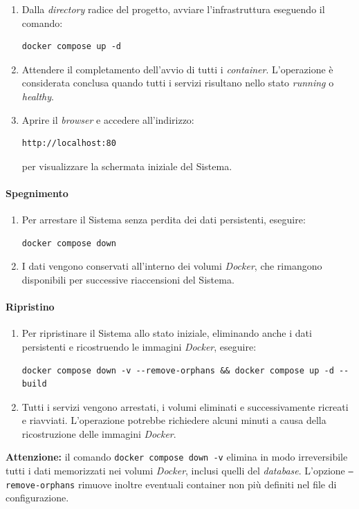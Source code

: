 \documentclass[10pt, letterpaper]{article}
\begin{document}
\begin{enumerate}
    \item Dalla \textit{directory} radice del progetto, avviare l'infrastruttura eseguendo il comando:
\begin{verbatim}
docker compose up -d
\end{verbatim}

    \item Attendere il completamento dell'avvio di tutti i \textit{container}. L'operazione è considerata conclusa quando tutti i servizi risultano nello stato \textit{running} o \textit{healthy}.

    \item Aprire il \textit{browser} e accedere all'indirizzo:
\begin{verbatim}
http://localhost:80
\end{verbatim}
per visualizzare la schermata iniziale del Sistema.
\end{enumerate}

\paragraph{Spegnimento}

\begin{enumerate}
    \item Per arrestare il Sistema senza perdita dei dati persistenti, eseguire:
\begin{verbatim}
docker compose down
\end{verbatim}

    \item I dati vengono conservati all'interno dei volumi \textit{Docker}, che rimangono disponibili per successive riaccensioni del Sistema.
\end{enumerate}

\paragraph{Ripristino}

\begin{enumerate}
    \item Per ripristinare il Sistema allo stato iniziale, eliminando anche i dati persistenti e ricostruendo le immagini \textit{Docker}, eseguire:
\begin{verbatim}
docker compose down -v --remove-orphans && docker compose up -d --build
\end{verbatim}

    \item Tutti i servizi vengono arrestati, i volumi eliminati e successivamente ricreati e riavviati. L'operazione potrebbe richiedere alcuni minuti a causa della ricostruzione delle immagini \textit{Docker}.
\end{enumerate}
\textbf{Attenzione:} il comando \texttt{docker compose down -v} elimina in modo irreversibile tutti i dati memorizzati nei volumi \textit{Docker}, inclusi quelli del \textit{database}. 
L'opzione \texttt{--remove-orphans} rimuove inoltre eventuali container non più definiti nel file di configurazione.
\end{document}
